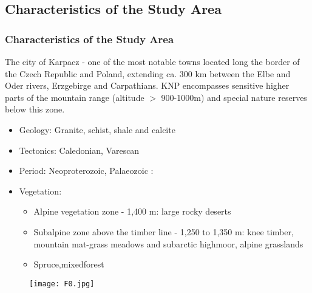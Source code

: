 \documentclass[pdflatex,compress,8pt,
	xcolor={dvipsnames,dvipsnames,svgnames,x11names,table},
	hyperref={
	breaklinks = true, 
	pdfauthor={Lemenkova Polina}, 
	pdfsubject={Preentation}, 
	pdfcreator={Lemenkova Polina}, 
	pdfproducer={Lemenkova Polina}, 
	citecolor=NavyBlue, 
	urlbordercolor=cyan,
	urlcolor = NavyBlue, 
	breaklinks = true}]{beamer}
\begin{document}
\subsection{Characteristics of the Study Area}
\begin{frame}\frametitle{Characteristics of the Study Area}
The city of Karpacz - one of the most notable towns located long the border of the Czech Republic and Poland, extending ca. 300 km between the Elbe and Oder rivers, Erzgebirge and Carpathians. KNP encompasses sensitive higher parts of the mountain range (altitude $>$ 900-1000m) and special nature reserves
below this zone.
\begin{itemize}
	\item Geology: Granite, schist, shale and calcite 
	\item Tectonics: Caledonian, Varescan
	\item Period: Neoproterozoic, Palaeozoic :
	\item Vegetation: 
	\begin{itemize}
		\item Alpine vegetation zone - 1,400 m: large rocky deserts
		\item Subalpine zone above the timber line - 1,250 to 1,350 m: knee timber, mountain mat-grass meadows and subarctic highmoor, alpine grasslands
		\item Spruce,mixedforest
	\end{itemize}
\end{itemize}
\begin{figure}[H]
	\centering
		\texttt{[image: F0.jpg]}
\end{figure}
\end{frame}
\end{document}
